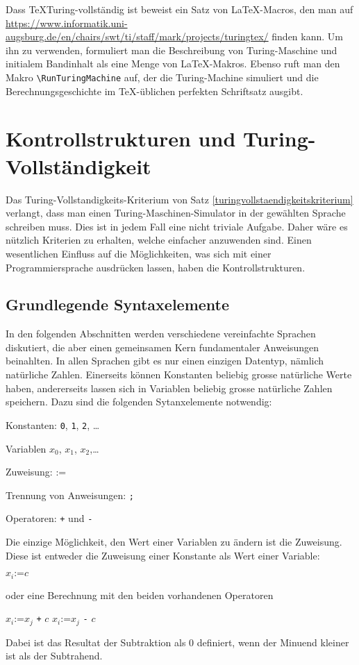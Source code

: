 Dass \TeX Turing-vollständig ist beweist ein Satz von \LaTeX-Macros, den
man auf
\url{https://www.informatik.uni-augsburg.de/en/chairs/swt/ti/staff/mark/projects/turingtex/}
finden kann.
Um ihn zu verwenden, formuliert man die Beschreibung
von Turing-Maschine und initialem Bandinhalt als eine Menge von
\LaTeX-Makros. Ebenso ruft man den Makro \verb+\RunTuringMachine+ auf,
der die Turing-Machine simuliert und die Berechnungsgeschichte im
\TeX-üblichen perfekten Schriftsatz ausgibt.



\section{Kontrollstrukturen und Turing-Vollständigkeit}
Das Turing-Vollstandigkeits-Kriterium von Satz
\ref{turingvollstaendigkeitskriterium} verlangt, dass man einen
Turing-Maschinen-Simulator in der gewählten Sprache schreiben muss.
Dies ist in jedem Fall eine nicht triviale Aufgabe.
Daher wäre es nützlich Kriterien zu erhalten, welche einfacher
anzuwenden sind. Einen wesentlichen Einfluss auf die Möglichkeiten,
was sich mit einer Programmiersprache ausdrücken lassen, haben die
Kontrollstrukturen.

\newcommand{\assignment}{\mathbin{\texttt{:=}}}

\subsection{Grundlegende Syntaxelemente%
\label{subsection:grundlegende-syntaxelement}}
In den folgenden Abschnitten werden verschiedene vereinfachte Sprachen
diskutiert, die aber einen gemeinsamen Kern fundamentaler Anweisungen
beinahlten.
In allen Sprachen gibt es nur einen einzigen Datentyp, nämlich
natürliche Zahlen.
Einerseits können Konstanten beliebig grosse natürliche Werte haben,
andererseits lassen sich in Variablen beliebig grosse natürliche Zahlen
speichern.
Dazu sind die folgenden Sytanxelemente notwendig:
\begin{compactitem}
\item Konstanten: {\tt 0}, {\tt 1}, {\tt 2}, \dots
\item Variablen $x_0$, $x_1$, $x_2$,\dots
\item Zuweisung: $\assignment$
\item Trennung von Anweisungen: {\tt ;}
\item Operatoren: {\tt +} und {\tt -}
\end{compactitem}
Die einzige Möglichkeit, den Wert einer Variablen zu ändern ist die
Zuweisung.  Diese ist entweder die Zuweisung einer Konstante als
Wert einer Variable:
\begin{algorithmic}
\STATE $x_i\assignment c$
\end{algorithmic}
oder eine Berechnung mit den beiden vorhandenen Operatoren
\begin{algorithmic}
\STATE $x_i \assignment x_j$ {\tt +} $c$
\STATE $x_i \assignment x_j$ {\tt -} $c$
\end{algorithmic}
Dabei ist das Resultat der Subtraktion als $0$ definiert, wenn
der Minuend kleiner ist als der Subtrahend.

